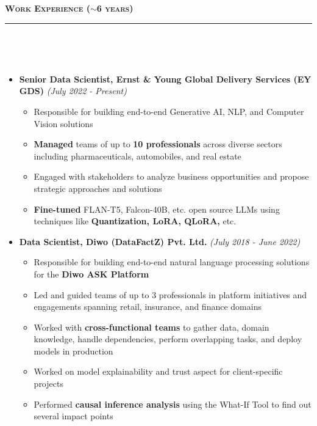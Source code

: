 \documentclass[a4paper,10pt]{article}
\newcommand{\isep}{-2 pt}
\newcommand{\lsep}{-0.5cm}
\newcommand{\resheading}[1]{{\small
        {
            \begin{minipage}
                {0.992\textwidth}\textbf{{\textsc{#1 \vphantom{p\^{E}} }}}
                \\[-0.3cm]
                \hrule
            \end{minipage}
            \\[-0.5cm]
        }
 }}
\begin{document}
\vspace{4pt}
\noindent
\resheading{\textbf{\large Work Experience ($\sim$6 years)}}\\[\lsep]
\vspace{4pt}
\begin{itemize}
    \item \textbf{Senior Data Scientist, Ernst \& Young Global Delivery Services (EY GDS)} \hfill {\emph{(July 2022 - Present)}}
    \\ [-0.6cm]
    \begin{itemize}\itemsep \isep
        \item Responsible for building end-to-end Generative AI, NLP, and Computer Vision solutions
        \item \textbf{Managed} teams of up to \textbf{10 professionals} across diverse sectors including pharmaceuticals, automobiles, and real estate
        \item Engaged with stakeholders to analyze business opportunities and propose strategic approaches and solutions
        \item \textbf{Fine-tuned} FLAN-T5, Falcon-40B, etc. open source LLMs using techniques like \textbf{Quantization, LoRA, QLoRA,} etc.
    \\ [-0.5cm]
    \end{itemize}
    
    \item \textbf{Data Scientist, Diwo (DataFactZ) Pvt. Ltd.} \hfill {\emph{(July 2018 - June 2022)}}
    \\ [-0.6cm]
    \begin{itemize}\itemsep \isep
        \item Responsible for building end-to-end natural language processing solutions for the \textbf{Diwo ASK Platform}
        \item Led and guided teams of up to 3 professionals in platform initiatives and engagements spanning retail, insurance, and finance domains
        \item Worked with \textbf{cross-functional teams} to gather data, domain knowledge, handle dependencies, perform overlapping tasks, and deploy models in production  
        \item Worked on model explainability and trust aspect for client-specific projects
        \item Performed \textbf{causal inference analysis} using the What-If Tool to find out several impact points
    \\ [-0.5cm]
    \end{itemize}
    

\end{itemize}
\end{document}
